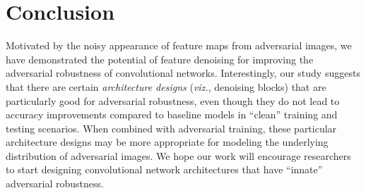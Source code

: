 \documentclass[10pt,twocolumn,letterpaper]{article}
\begin{document}
\section{Conclusion}

Motivated by the noisy appearance of feature maps from adversarial images, we have demonstrated the potential of feature denoising for improving the adversarial robustness of convolutional networks. Interestingly, our study suggests that there are certain \emph{architecture designs} (\emph{viz.}, denoising blocks) that are particularly good for adversarial robustness, even though they do not lead to accuracy improvements compared to baseline models in ``clean'' training and testing scenarios. When combined with adversarial training, these particular architecture designs may be more appropriate for modeling the underlying distribution of adversarial images. We hope our work will encourage researchers to start designing convolutional network architectures that have ``innate'' adversarial robustness.

{\small


}
\end{document}
